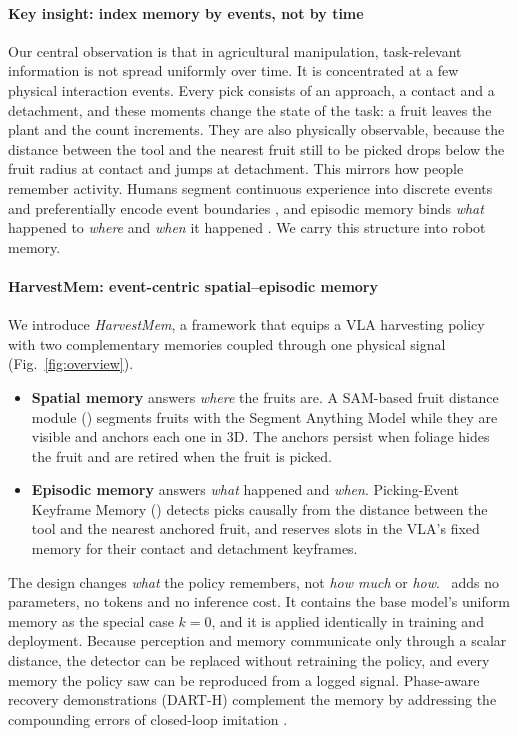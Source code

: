 \paragraph{Key insight: index memory by events, not by time} Our central observation is that in agricultural manipulation, task-relevant information is not spread uniformly over time. It is concentrated at a few physical interaction events. Every pick consists of an approach, a contact and a detachment, and these moments change the state of the task: a fruit leaves the plant and the count increments. They are also physically observable, because the distance between the tool and the nearest fruit still to be picked drops below the fruit radius at contact and jumps at detachment. This mirrors how people remember activity. Humans segment continuous experience into discrete events and preferentially encode event boundaries \citep{zacks2007event}, and episodic memory binds \emph{what} happened to \emph{where} and \emph{when} it happened \citep{tulving1972episodic,clayton1998episodic}. We carry this structure into robot memory.

\paragraph{HarvestMem: event-centric spatial--episodic memory} We introduce \emph{HarvestMem}, a framework that equips a VLA harvesting policy with two complementary memories coupled through one physical signal (Fig.~\ref{fig:overview}).
\begin{itemize}
\item \textbf{Spatial memory} answers \emph{where} the fruits are. A SAM-based fruit distance module (\fdm) segments fruits with the Segment Anything Model \citep{kirillov2023sam} while they are visible and anchors each one in 3D. The anchors persist when foliage hides the fruit and are retired when the fruit is picked.
\item \textbf{Episodic memory} answers \emph{what} happened and \emph{when}. Picking-Event Keyframe Memory (\pekm) detects picks causally from the distance between the tool and the nearest anchored fruit, and reserves slots in the VLA's fixed memory for their contact and detachment keyframes.
\end{itemize}
The design changes \emph{what} the policy remembers, not \emph{how much} or \emph{how}. \pekm\ adds no parameters, no tokens and no inference cost. It contains the base model's uniform memory as the special case $k=0$, and it is applied identically in training and deployment. Because perception and memory communicate only through a scalar distance, the detector can be replaced without retraining the policy, and every memory the policy saw can be reproduced from a logged signal. Phase-aware recovery demonstrations (DART-H) complement the memory by addressing the compounding errors of closed-loop imitation \citep{ross2011dagger}.

